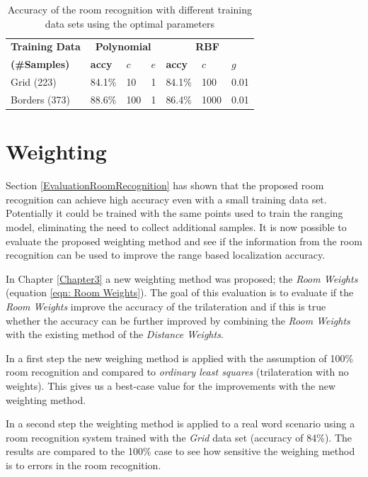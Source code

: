\begin{table}
\centering
\begin{tabular}{l l l l l l l}
\toprule
\textbf{Training Data}&\multicolumn{3}{c}{\textbf{Polynomial}}&\multicolumn{3}{c}{\textbf{RBF}}\\
\textbf{(\#Samples)}&\textbf{accy}&$c$&$e$&\textbf{accy}&$c$&$g$\\
\midrule
Grid (223)&84.1\%&10&1&84.1\%&100&0.01\\
Borders (373)&88.6\%&100&1&86.4\%&1000&0.01\\
\bottomrule
\end{tabular}
\caption[Room Recognition - optimized parameters]{Accuracy of the room recognition with different training data sets using the optimal parameters}
\label{tab:SVMconfigurationPoly}
\end{table}

\newpage

\section{Weighting}
\label{EvaluationWeighting}

Section \ref{EvaluationRoomRecognition} has shown that the proposed room recognition can achieve high accuracy even with a small training data set. Potentially it could be trained with the same points used to train the ranging model, eliminating the need to collect additional samples. It is now possible to evaluate the proposed weighting method and see if the information from the room recognition can be used to improve the range based localization accuracy.

In Chapter \ref{Chapter3} a new weighting method was proposed; the \emph{Room Weights} (equation \ref{eqn: Room Weights}). The goal of this evaluation is to evaluate if the \emph{Room Weights} improve the accuracy of the trilateration and if this is true whether the accuracy can be further improved by combining the \emph{Room Weights} with the existing method of the \emph{Distance Weights}.

In a first step the new weighing method is applied with the assumption of 100\% room recognition and compared to \emph{ordinary least squares} (trilateration with no weights). This gives us a best-case value for the improvements with the new weighting method.

In a second step the weighting method is applied to a real word scenario using a room recognition system trained with the \emph{Grid} data set (accuracy of 84\%). The results are compared to the 100\% case to see how sensitive the weighing method is to errors in the room recognition.

